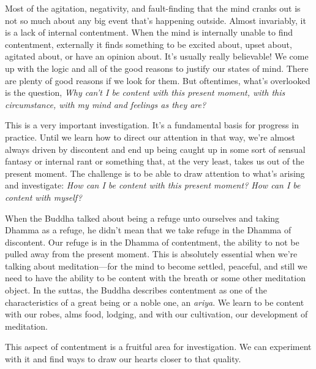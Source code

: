 Most of the agitation, negativity, and fault-finding that the mind 
cranks out is not so much about any big event that's happening outside. 
Almost invariably, it is a lack of internal contentment. When the mind 
is internally unable to find contentment, externally it finds something 
to be excited about, upset about, agitated about, or have an opinion 
about. It's usually really believable! We come up with the logic and 
all of the good reasons to justify our states of mind. There are plenty 
of good reasons if we look for them. But oftentimes, what's overlooked 
is the question, \emph{Why can't I be content with this present moment, 
with this circumstance, with my mind and feelings as they are?}

This is a very important investigation. It's a fundamental basis for 
progress in practice. Until we learn how to direct our attention in 
that way, we're almost always driven by discontent and end up being 
caught up in some sort of sensual fantasy or internal rant or something 
that, at the very least, takes us out of the present moment. The 
challenge is to be able to draw attention to what's arising and 
investigate: \emph{How can I be content with this present moment? How 
can I be content with myself?}

When the Buddha talked about being a refuge unto ourselves and taking 
Dhamma as a refuge, he didn't mean that we take refuge in the Dhamma of 
discontent. Our refuge is in the Dhamma of contentment, the ability to 
not be pulled away from the present moment. This is absolutely 
essential when we're talking about meditation---for the mind to become 
settled, peaceful, and still we need to have the ability to be content 
with the breath or some other meditation object. In the suttas, the 
Buddha describes contentment as one of the characteristics of a great 
being or a noble one, an \emph{ariya}. We learn to be content with our 
robes, alms food, lodging, and with our cultivation, our development of 
meditation.

This aspect of contentment is a fruitful area for investigation. We can 
experiment with it and find ways to draw our hearts closer to that 
quality.


